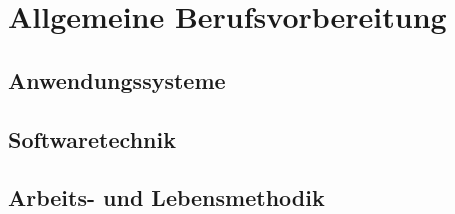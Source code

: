 \part{Allgemeine Berufsvorbereitung}
\chapter{Anwendungssysteme}

\chapter{Softwaretechnik}

\chapter{Arbeits- und Lebensmethodik}

